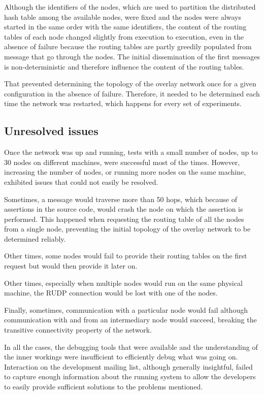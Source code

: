 Although the identifiers of the nodes, which are used to partition the distributed hash table among the available nodes, were fixed and the nodes were always started in the same order with the same identifiers, the content of the routing tables of each node changed slightly from execution to execution, even in the absence of failure because the routing tables are partly greedily populated from message that go through the nodes. The initial dissemination of the first messages is non-deterministic and therefore influence the content of the routing tables.

That prevented determining the topology of the overlay network once for a given configuration in the absence of failure. Therefore, it needed to be determined each time the network was restarted, which happens for every set of experiments.

\subsection{Unresolved issues}

Once the network was up and running, tests with a small number of nodes, up to 30 nodes on different machines, were successful most of the times. However, increasing the number of nodes, or running more nodes on the same machine, exhibited issues that could not easily be resolved.

Sometimes, a message would traverse more than 50 hops, which because of assertions in the source code, would crash the node on which the assertion is performed. This happened when requesting the routing table of all the nodes from a single node, preventing the initial topology of the overlay network to be determined reliably.

Other times, some nodes would fail to provide their routing tables on the first request but would then provide it later on. 

Other times, especially when multiple nodes would run on the same physical machine, the RUDP connection would be lost with one of the nodes.

Finally, sometimes, communication with a particular node would fail although communication with and from an intermediary node would succeed, breaking the transitive connectivity property of the network.

In all the cases, the debugging tools that were available and the understanding of the inner workings were insufficient to efficiently debug what was going on. Interaction on the development mailing list, although generally insightful, failed to capture enough information about the running system to allow the developers to easily provide sufficient solutions to the problems mentioned.

